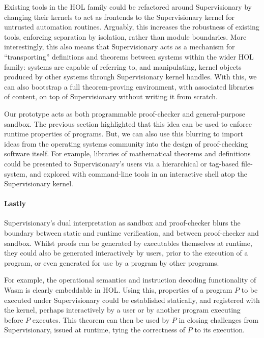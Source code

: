 \documentclass[sigplan, review]{acmart}
\begin{document}
Existing tools in the HOL family could be refactored around Supervisionary by changing their kernels to act as frontends to the Supervisionary kernel for untrusted automation routines.
Arguably, this increases the robustness of existing tools, enforcing separation by isolation, rather than module boundaries.
More interestingly, this also means that Supervisionary acts as a mechanism for ``transporting'' definitions and theorems between systems within the wider HOL family: systems are capable of referring to, and manipulating, kernel objects produced by other systems through Supervisionary kernel handles.
With this, we can also bootstrap a full theorem-proving environment, with associated libraries of content, on top of Supervisionary without writing it from scratch.

Our prototype acts as both programmable proof-checker and general-purpose sandbox.
The previous section highlighted that this idea can be used to enforce runtime properties of programs.
But, we can also use this blurring to import ideas from the operating systems community into the design of proof-checking software itself.
For example, libraries of mathematical theorems and definitions could be presented to Supervisionary's users via a hierarchical or tag-based file-system, and explored with command-line tools in an interactive shell atop the Supervisionary kernel.

\paragraph{Lastly}

Supervisionary's dual interpretation as sandbox and proof-checker blurs the boundary between static and runtime verification, and between proof-checker and sandbox.
Whilst proofs can be generated by executables themselves at runtime, they could also be generated interactively by users, prior to the execution of a program, or even generated for use by a program by other programs.

For example, the operational semantics and instruction decoding functionality of Wasm is clearly embeddable in HOL.
Using this, properties of a program $P$ to be executed under Supervisionary could be established statically, and registered with the kernel, perhaps interactively by a user or by another program executing before $P$ executes.
This theorem can then be used by $P$ in closing challenges from Supervisionary, issued at runtime, tying the correctness of $P$ to its execution.
\end{document}
